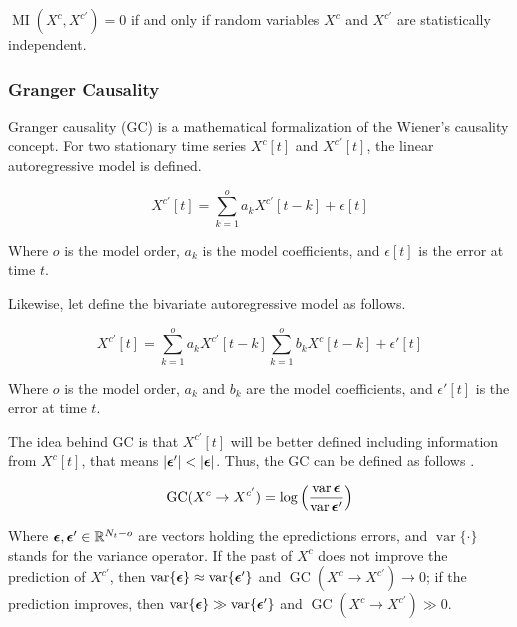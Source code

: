 $\operatorname{MI}(X^{c}, X^{c'})=0$ if and only if random variables $X^{c}$ and $X^{c'}$ are statistically independent.

\subsubsection{Granger Causality}

Granger causality (GC) is a mathematical formalization of the Wiener's causality concept. For two stationary time series $X^{c}[t]$ and $X^{c'}[t]$, the linear autoregressive model is defined.

\begin{equation}
    X^{c'}[t] = \sum_{k=1}^{o} a_k X^{c'}[t-k] + \epsilon[t]
\end{equation}

Where $o$ is the model order, $a_k$ is the model coefficients, and $\epsilon[t]$ is the error at time $t$. 

Likewise, let define the bivariate autoregressive model as follows.

\begin{equation}
     X^{c'}[t] = \sum_{k=1}^{o} a_k X^{c'}[t-k] \sum_{k=1}^{o} b_k X^{c}[t-k] + \epsilon'[t]
\end{equation}

Where $o$ is the model order, $a_k$ and $b_k$ are the model coefficients, and $\epsilon'[t]$ is the error at time $t$. 

The idea behind GC is that $X^{c'}[t]$ will be better defined including information from $X^{c}[t]$, that means $|\ve{\epsilon}'|<|\ve{\epsilon}|$. Thus, the GC can be defined as follows \cite{rezaei2023classification}.

\begin{equation} 
\operatorname{GC}(X^{c} \rightarrow X^{c'}) = \log \left( \frac{\operatorname{var}{\bm {\epsilon}}}{\operatorname{var}{\bm {\epsilon}'}} \right) 
\end{equation}

Where $\bm {\epsilon}, \bm {\epsilon}' \in \mathbb{R}^{N_t-o}$ are vectors holding the epredictions errors, and $\operatorname{var}\{\cdot\}$ stands for the variance operator. If the past of $X^{c}$ does not improve the prediction of $X^{c'}$, then $\operatorname{var}\{\bm {\epsilon}\} \approx \operatorname{var}\{\bm {\epsilon}'\}$ and $\operatorname{GC}(X^{c} \rightarrow X^{c'}) \rightarrow 0 $; if the prediction improves, then $\operatorname{var}\{\bm {\epsilon}\} \gg \operatorname{var}\{\bm {\epsilon}'\}$ and $\operatorname{GC}(X^{c} \rightarrow X^{c'}) \gg 0 $.


